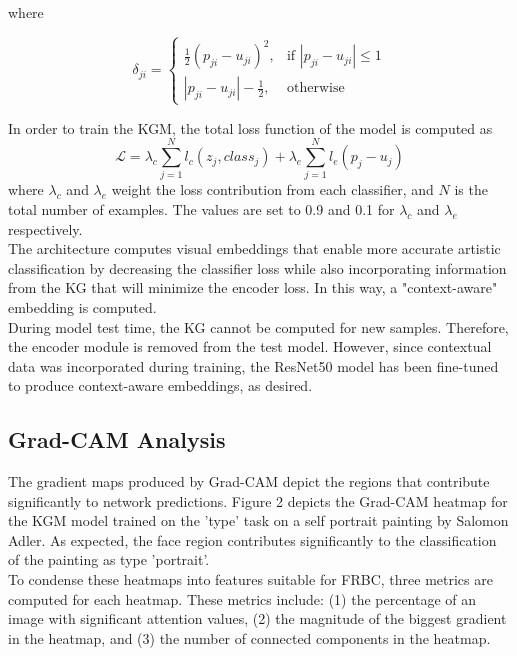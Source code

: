 \documentclass{article}
\begin{document}
where 

\begin{equation}\label{E:3}
\delta_{ji}= 
\begin{cases}
    \frac{1}{2}(p_{ji}-u_{ji})^2,& \text{if } |p_{ji}-u_{ji}| \leq 1\\
    |p_{ji}-u_{ji}|-\frac{1}{2},              & \text{otherwise}
\end{cases}
\end{equation}

In order to train the KGM, the total loss function of the model is computed as
\begin{equation}\label{E:4}
\mathscr{L} = \lambda_c \sum_{j=1}^{N} l_c(z_j, {class}_j) + \lambda_e \sum_{j=1}^N l_e(p_j - u_j)
\end{equation}
where $\lambda_c$ and $\lambda_e$ weight the loss contribution from each classifier, and $N$ is the total number of examples. The values are set to 0.9 and 0.1 for $\lambda_c$ and $\lambda_e$ respectively. \\

The architecture computes visual embeddings that enable more accurate artistic classification by decreasing the classifier loss while also incorporating information from the KG that will minimize the encoder loss. In this way, a "context-aware" embedding is computed. \\

During model test time, the KG cannot be computed for new samples. Therefore, the encoder module is removed from the test model. However, since contextual data was incorporated during training, the ResNet50 model has been fine-tuned to produce context-aware embeddings, as desired.

\subsection{Grad-CAM Analysis}
The gradient maps produced by Grad-CAM depict the regions that contribute significantly to network predictions. Figure 2 depicts the Grad-CAM heatmap for the KGM model trained on the 'type' task on a self portrait painting by Salomon Adler. As expected, the face region contributes significantly to the classification of the painting as type 'portrait'. \\

To condense these heatmaps into features suitable for FRBC, three metrics are computed for each heatmap. These metrics include: (1) the percentage of an image with significant attention values, (2) the magnitude of the biggest gradient in the heatmap, and (3) the number of connected components in the heatmap. 
\\ 
\end{document}
